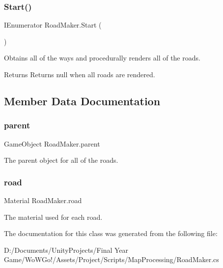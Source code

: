 \subsubsection{\texorpdfstring{Start()}{Start()}}
{\footnotesize\ttfamily I\+Enumerator Road\+Maker.\+Start (\begin{DoxyParamCaption}{ }\end{DoxyParamCaption})\hspace{0.3cm}{\ttfamily [private]}}



Obtains all of the ways and procedurally renders all of the roads. 

\begin{DoxyReturn}{Returns}
Returns null when all roads are rendered.
\end{DoxyReturn}


\subsection{Member Data Documentation}
\mbox{\label{class_road_maker_aa892946b6d1b47b0dcb7a5a68e7c48bd}} 
\subsubsection{\texorpdfstring{parent}{parent}}
{\footnotesize\ttfamily Game\+Object Road\+Maker.\+parent}



The parent object for all of the roads. 

\mbox{\label{class_road_maker_afb1365cbabda6f413a89d5d04434a72f}} 
\subsubsection{\texorpdfstring{road}{road}}
{\footnotesize\ttfamily Material Road\+Maker.\+road}



The material used for each road. 



The documentation for this class was generated from the following file\+:\begin{DoxyCompactItemize}
\item 
D\+:/\+Documents/\+Unity\+Projects/\+Final Year Game/\+Wo\+W\+Go!/\+Assets/\+Project/\+Scripts/\+Map\+Processing/Road\+Maker.\+cs\end{DoxyCompactItemize}

